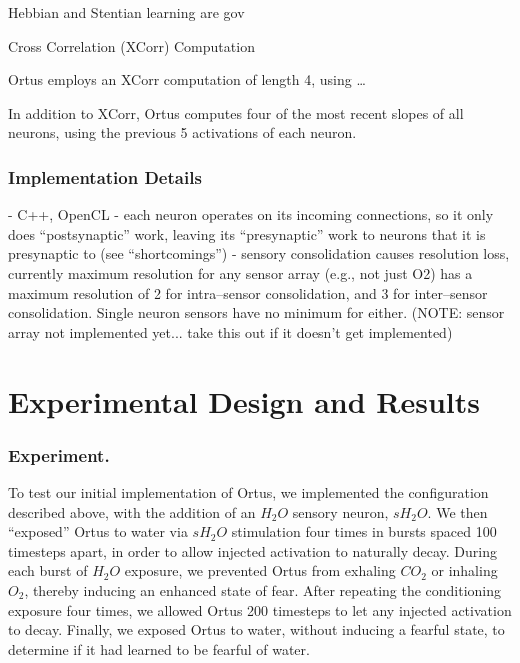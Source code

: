 \documentclass[letterpaper]{article}
\begin{document}



% 

Hebbian and Stentian learning are gov

Cross Correlation (XCorr) Computation

Ortus employs an XCorr computation of length 4, using \ldots

In addition to XCorr, Ortus computes four of the most recent slopes of all neurons, using the previous 5 activations of each neuron.

\subsubsection{Implementation Details}
- C++, OpenCL
- each neuron operates on its incoming connections, so it only does ``postsynaptic'' work, leaving its ``presynaptic'' work to neurons that it is presynaptic to (see ``shortcomings'')
- sensory consolidation causes resolution loss, currently maximum resolution for any sensor array (e.g., not just O2) has a maximum resolution of 2 for intra--sensor consolidation, and 3 for inter--sensor consolidation. Single neuron sensors have no minimum for either. (NOTE: sensor array not implemented yet... take this out if it doesn't get implemented)

\section{Experimental Design and Results}

\subsubsection{Experiment.} To test our initial implementation of Ortus, we implemented the configuration described above, with the addition of an $H_2O$ sensory neuron, $sH_2O$.
We then ``exposed'' Ortus to water via $sH_2O$ stimulation four times in bursts spaced 100 timesteps apart, in order to allow injected activation to naturally decay.
During each burst of $H_2O$ exposure, we prevented Ortus from exhaling $CO_2$ or inhaling $O_2$, thereby inducing an enhanced state of fear.
After repeating the conditioning exposure four times, we allowed Ortus 200 timesteps to let any injected activation to decay.
Finally, we exposed Ortus to water, without inducing a fearful state, to determine if it had learned to be fearful of water.
\end{document}
